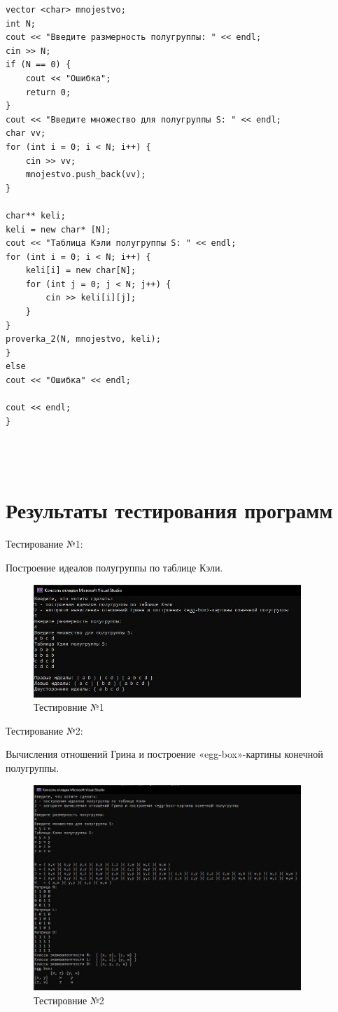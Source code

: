 \documentclass[bachelor, och, labwork]{shiza}
\begin{document}
\begin{verbatim}
vector <char> mnojestvo;
int N;
cout << "Введите размерность полугруппы: " << endl;
cin >> N;
if (N == 0) {
	cout << "Ошибка";
	return 0;
}
cout << "Введите множество для полугруппы S: " << endl;
char vv;
for (int i = 0; i < N; i++) {
	cin >> vv;
	mnojestvo.push_back(vv);
}

char** keli;
keli = new char* [N];
cout << "Таблица Кэли полугруппы S: " << endl;
for (int i = 0; i < N; i++) {
	keli[i] = new char[N];
	for (int j = 0; j < N; j++) {
		cin >> keli[i][j];
	}
}
proverka_2(N, mnojestvo, keli);
}
else
cout << "Ошибка" << endl;

cout << endl;
}


	
	\end{verbatim}
	
	\section{Результаты тестирования программ}
	
	Тестирование №1:
	
Построение идеалов полугруппы по таблице Кэли.

	\begin{figure}[H]
		\centering
		\includegraphics[width=0.9\textwidth]{test_1}
		\caption{Тестировние №1}
		\label{fig:test_1}
	\end{figure}
	
	Тестирование №2:
	
Вычисления отношений Грина и построение «egg-box»-картины конечной полугруппы.
	
	\begin{figure}[H]
		\centering
		\includegraphics[width=0.9\textwidth]{test_2}
		\caption{Тестировние №2}
		\label{fig:test_2}
	\end{figure}
\end{document}
